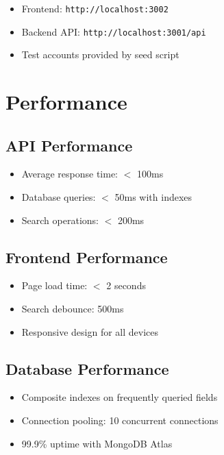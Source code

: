 \documentclass[12pt, a4paper, oneside]{report}
\begin{document}
\begin{itemize}
  \item Frontend: \texttt{http://localhost:3002}
  \item Backend API: \texttt{http://localhost:3001/api}
  \item Test accounts provided by seed script
\end{itemize}

\chapter{Performance}

\section{API Performance}

\begin{itemize}
  \item Average response time: $<$ 100ms
  \item Database queries: $<$ 50ms with indexes
  \item Search operations: $<$ 200ms
\end{itemize}

\section{Frontend Performance}

\begin{itemize}
  \item Page load time: $<$ 2 seconds
  \item Search debounce: 500ms
  \item Responsive design for all devices
\end{itemize}

\section{Database Performance}

\begin{itemize}
  \item Composite indexes on frequently queried fields
  \item Connection pooling: 10 concurrent connections
  \item 99.9\% uptime with MongoDB Atlas
\end{itemize}
\end{document}
